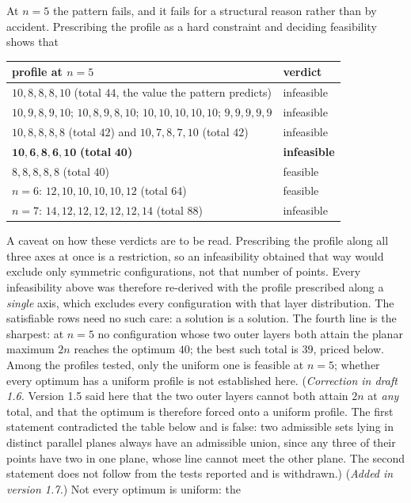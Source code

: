 \documentclass[11pt,a4paper]{article}
\begin{document}
At $n=5$ the pattern fails, and it fails for a structural reason rather than by accident.  Prescribing the
profile as a hard constraint and deciding feasibility shows that
\begin{center}\begin{tabular}{ll}\toprule
profile at $n=5$ & verdict\\\midrule
$10,8,8,8,10$ (total $44$, the value the pattern predicts) & infeasible\\
$10,9,8,9,10$; $10,8,9,8,10$; $10,10,10,10,10$; $9,9,9,9,9$ & infeasible\\
$10,8,8,8,8$ (total $42$) and $10,7,8,7,10$ (total $42$) & infeasible\\
$\mathbf{10,6,8,6,10}$ \textbf{(total }$\mathbf{40}$\textbf{)} & \textbf{infeasible}\\
$8,8,8,8,8$ (total $40$) & feasible\\\midrule
$n=6$: $12,10,10,10,10,12$ (total $64$) & feasible\\
$n=7$: $14,12,12,12,12,12,14$ (total $88$) & infeasible\\\bottomrule
\end{tabular}\end{center}
A caveat on how these verdicts are to be read.  Prescribing the profile along all three axes at once is a
restriction, so an infeasibility obtained that way would exclude only symmetric configurations, not that number
of points.  Every infeasibility above was therefore re-derived with the profile prescribed along a
\emph{single} axis, which excludes every configuration with that layer distribution.  The satisfiable rows need
no such care: a solution is a solution.
The fourth line is the sharpest: at $n=5$ no configuration whose two outer layers both attain the planar
maximum $2n$ reaches the optimum $40$; the best such total is $39$, priced below.  Among the profiles tested,
only the uniform one is feasible at $n=5$; whether every optimum has a uniform profile is not established here.
(\emph{Correction in draft 1.6.}  Version 1.5 said here that the two outer layers cannot both attain $2n$ at
\emph{any} total, and that the optimum is therefore forced onto a uniform profile.  The first statement
contradicted the table below and is false: two admissible sets lying in distinct parallel planes always have an
admissible union, since any three of their points have two in one plane, whose line cannot meet the other
plane.  The second statement does not follow from the tests reported and is withdrawn.)  (\emph{Added in version 1.7.})  Not every optimum is uniform: the
\end{document}
